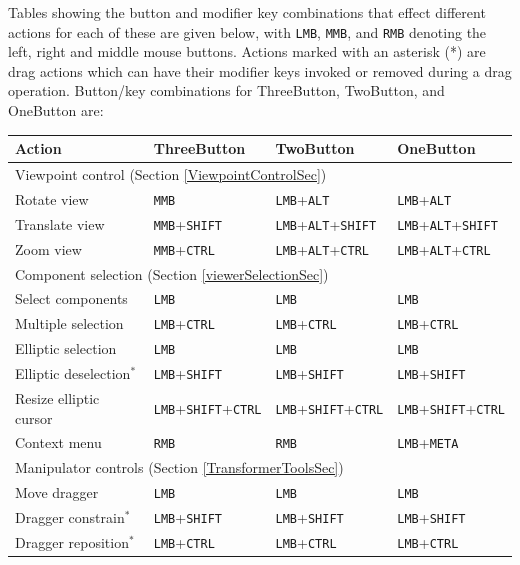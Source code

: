 \documentclass{article}
\begin{document}
Tables showing the button and modifier key combinations that effect
different actions for each of these are given below, with {\tt LMB},
{\tt MMB}, and {\tt RMB} denoting the left, right and middle mouse
buttons.  Actions marked with an asterisk (*) are drag actions which
can have their modifier keys invoked or removed during a drag
operation. Button/key combinations for {\sf ThreeButton}, {\sf
TwoButton}, and {\sf OneButton} are:

\begin{center}
\begin{tabular}{|l|l|l|l|}
\hline
Action & {\sf ThreeButton} & {\sf TwoButton} & {\sf OneButton}\\
\hline
\hline
\multicolumn{4}{|l|}{Viewpoint control (Section \ref{ViewpointControlSec})}\\
\hline
Rotate view & 
{\tt MMB} & {\tt LMB}+{\tt ALT} & {\tt LMB}+{\tt ALT}\\
Translate view & 
{\tt MMB}+{\tt SHIFT} & {\tt LMB}+{\tt ALT}+{\tt SHIFT} & 
{\tt LMB}+{\tt ALT}+{\tt SHIFT}\\
Zoom view & 
{\tt MMB}+{\tt CTRL} & {\tt LMB}+{\tt ALT}+{\tt CTRL} & 
{\tt LMB}+{\tt ALT}+{\tt CTRL}\\
\hline
\multicolumn{4}{|l|}{Component selection (Section \ref{viewerSelectionSec})}\\
\hline
Select components & 
{\tt LMB} & {\tt LMB} & {\tt LMB}\\
Multiple selection & 
{\tt LMB}+{\tt CTRL} & {\tt LMB}+{\tt CTRL} & {\tt LMB}+{\tt CTRL}\\
Elliptic selection & 
{\tt LMB} & {\tt LMB} & {\tt LMB}\\
Elliptic deselection$^*$ & 
{\tt LMB}+{\tt SHIFT} & {\tt LMB}+{\tt SHIFT} & {\tt LMB}+{\tt SHIFT}\\
Resize elliptic cursor & 
{\tt LMB}+{\tt SHIFT}+{\tt CTRL} & {\tt LMB}+{\tt SHIFT}+{\tt CTRL} & 
{\tt LMB}+{\tt SHIFT}+{\tt CTRL}\\
Context menu & 
{\tt RMB} & {\tt RMB} & {\tt LMB}+{\tt META}\\
\hline
\multicolumn{4}{|l|}{Manipulator controls (Section \ref{TransformerToolsSec})}\\
\hline
Move dragger & 
{\tt LMB} & {\tt LMB} & {\tt LMB}\\
Dragger constrain$^*$ & 
{\tt LMB}+{\tt SHIFT} & {\tt LMB}+{\tt SHIFT} & {\tt LMB}+{\tt SHIFT}\\
Dragger reposition$^*$ & 
{\tt LMB}+{\tt CTRL} & {\tt LMB}+{\tt CTRL} & {\tt LMB}+{\tt CTRL}\\
\hline
\end{tabular}
\end{center}
\end{document}
